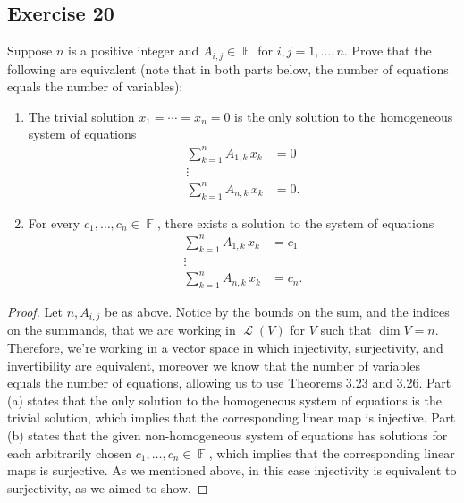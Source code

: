 \documentclass[letterpaper, 12pt]{amsart}
\DeclareMathOperator{\F}{\mathbb{F}}
\DeclareMathOperator{\Ell}{\mathscr{L}}
\theoremstyle{definition}  %
\begin{document}
		\subsection*{Exercise 20}
		Suppose $n$ is a positive integer and $A_{i,j} \in \F$ for $i,j = 1, \dots, n$. 
		Prove that the following are equivalent (note that in both parts below, the number of equations equals the number of variables):
		\begin{enumerate}[\hspace{5mm} (a)]
			\item The trivial solution $x_{1} = \cdots = x_{n} = 0$ is the only solution to the homogeneous system of equations
			\begin{align*}
				\sum_{k=1}^{n} A_{1,k} \, x_{k} &= 0 \\
				\vdots & \\
				\sum_{k=1}^{n} A_{n,k} \, x_{k} &= 0.
			\end{align*}
			
			\item For every $c_{1}, \dots , c_{n} \in \F$, there exists a solution to the system of equations
			\begin{align*}
				\sum_{k=1}^{n} A_{1,k} \, x_{k} &= c_{1} \\
				\vdots & \\
				\sum_{k=1}^{n} A_{n,k} \, x_{k} &= c_{n}.
			\end{align*}
		\end{enumerate}
		
		\begin{proof}
		Let $n, A_{i,j}$ be as above.
		Notice by the bounds on the sum, and the indices on the summands, that we are working in $\Ell(V)$ for $V$ such that $\dim V = n$.
		Therefore, we're working in a vector space in which injectivity, surjectivity, and invertibility are equivalent, moreover we know that the number of variables equals the number of equations, allowing us to use Theorems 3.23 and 3.26.
		Part (a) states that the only solution to the homogeneous system of equations is the trivial solution, which implies that the corresponding linear map is injective. 
		Part (b) states that the given non-homogeneous system of equations has solutions for each arbitrarily chosen $c_{1}, \dots , c_{n} \in \F$, which implies that the corresponding linear maps is surjective.
		As we mentioned above, in this case injectivity is equivalent to surjectivity, as we aimed to show.
		\end{proof}
\end{document}
